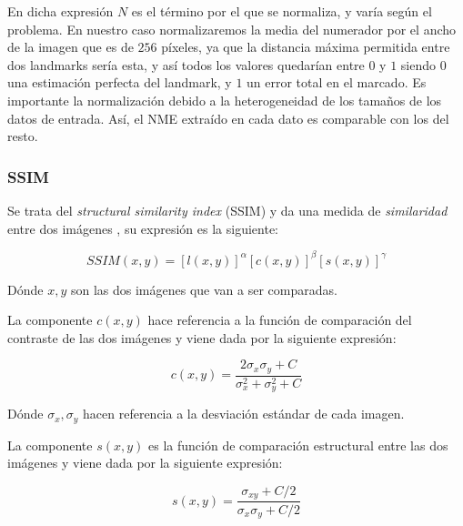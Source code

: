             \noindent En dicha expresión $N$ es el término por el que se normaliza, y varía según el problema. En nuestro caso normalizaremos la media del numerador por el ancho de la imagen que es de $256$ píxeles, ya que la distancia máxima permitida entre dos landmarks sería esta, y así todos los valores quedarían entre $0$ y $1$ siendo $0$ una estimación perfecta del landmark, y $1$ un error total en el marcado. Es importante la normalización debido a la heterogeneidad de los tamaños de los datos de entrada. Así, el NME extraído en cada dato es comparable con los del resto.

            \subsubsection{SSIM}
            \noindent Se trata del \textit{structural similarity index} (SSIM) y da una medida de \textit{similaridad} entre dos imágenes \cite{wang2004image}, su expresión es la siguiente: 

            \begin{equation}
                SSIM(x,y)=[l(x,y)]^\alpha[c(x,y)]^{\beta}[s(x,y)]^{\gamma}
            \end{equation}

            \medskip

            \noindent Dónde $x,y$ son las dos imágenes que van a ser comparadas.

            \medskip

            \noindent La componente $c(x,y)$ hace referencia a la función de comparación del contraste de las dos imágenes y viene dada por la siguiente expresión: 

            \begin{equation}
                c(x,y)=\frac{2\sigma_x \sigma_y + C}{\sigma_x^2+ \sigma_y^2+C}
            \end{equation}

            \noindent Dónde $\sigma_x, \sigma_y$ hacen referencia a la desviación estándar de cada imagen.

            \medskip

            \noindent La componente $s(x,y)$ es la función de comparación estructural entre las dos imágenes y viene dada por la siguiente expresión:

            \begin{equation}
                s(x,y)=\frac{\sigma_{xy}+C/2}{\sigma_x \sigma_y +C/2}
            \end{equation}

